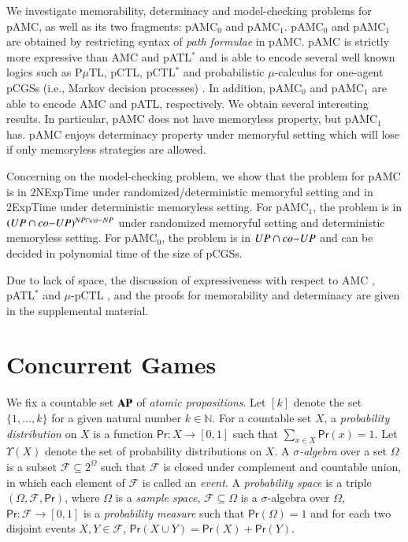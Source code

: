 \documentclass[letterpaper]{article}
\newcommand{\AP}{{\bf AP}}
\newcommand{\calF}{\mathcal{F}}
\newcommand{\Prb}{\textsf{Pr}}
\newcommand{\nat}{\mathbb{N}}
\newcommand{\pamc}{{pAMC}\xspace}
\newcommand{\pamcs}{{pAMC$_0$}\xspace}
\newcommand{\pamcc}{{pAMC$_1$}\xspace}
\begin{document}
We investigate memorability, determinacy and model-checking problems for \pamc, as well as its two fragments: \pamcs and \pamcc. \pamcs and \pamcc are obtained by restricting syntax of \emph{path formulae} in \pamc.
\pamc is strictly more expressive than AMC and pATL$^*$ \cite{CL07a} and is able to encode several well known logics such as P$\mu$TL,  pCTL, pCTL$^*$ and probabilistic $\mu$-calculus for one-agent pCGSs (i.e., Markov decision processes) \cite{LSWZ15,CKP15}.
In addition, \pamcs and \pamcc are able to encode AMC and pATL, respectively.
We obtain several interesting results. In particular,  \pamc does not have memoryless property, but \pamcc has.
\pamc enjoys determinacy property under memoryful setting which will lose if only memoryless strategies are allowed.

Concerning on the model-checking problem, we show that the problem for \pamc is in {\sc 2NExpTime} under randomized/deterministic memoryful setting and in {\sc 2ExpTime} under deterministic memoryless setting.
For \pamcc, the problem
is in $({\sc UP\cap co{-}UP})^{{\sc NP\cap co{-}NP}}$ under randomized memoryful setting and
deterministic memoryless setting. For \pamcs, the problem is in ${\sc UP\cap co{-}UP}$ and can be decided in polynomial time
of the size of pCGSs.


Due to lack of space, the discussion of expressiveness with respect to AMC \cite{AHK02}, pATL$^*$ \cite{CL07a} and $\mu$-pCTL \cite{CKP15}, and the proofs for memorability and determinacy are given in the supplemental material.


\section{Concurrent Games}
We fix a countable set $\AP$ of \emph{atomic propositions}.
Let $[k]$ denote the set $\{1,...,k\}$ for a given natural number $k\in \nat$.
For a countable set $X$, a \emph{probability distribution} on $X$
is a function $\Prb:X\rightarrow[0,1]$ such that $\sum_{x\in X}\Prb(x)=1$.  Let $\Upsilon(X)$ denote the set of probability distributions on $X$.
A \emph{$\sigma$-algebra} over a set $\Omega$ is a subset $\calF\subseteq 2^\Omega$ such that $\calF$ is closed under complement and countable union, in which each element of $\calF$ is called an \emph{event}.
A \emph{probability space} is a triple $(\Omega,\calF, \Prb)$, where $\Omega$ is a \emph{sample space}, $\calF\subseteq \Omega$ is a $\sigma$-algebra over $\Omega$, $\Prb:\calF\rightarrow[0,1]$ is a
\emph{probability measure} such that $\Prb(\Omega)=1$ and for each two disjoint events $X,Y\in \calF$, $\Prb(X\cup Y)=\Prb(X)+\Prb(Y)$.
\end{document}
